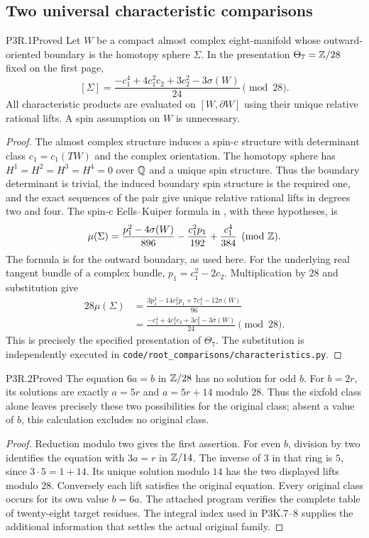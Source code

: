 \subsection{Two universal characteristic comparisons}

\begin{statement}{P3R.1}{Proved}
Let $W$ be a compact almost complex eight-manifold whose
outward-oriented boundary is the homotopy sphere $\Sigma$.
In the presentation $\Theta_7=\mathbb Z/28$ fixed on the first page,
\[
 [\Sigma]=
 \frac{-c_1^4+4c_1^2c_2+3c_2^2-3\sigma(W)}{24}
 \pmod {28}.
\]
All characteristic products are evaluated on $[W,\partial W]$
using their unique relative rational lifts. A spin assumption
on $W$ is unnecessary.
\end{statement}
\begin{proof}
The almost complex structure induces a spin-c structure
with determinant class $c_1=c_1(TW)$ and the complex
orientation. The homotopy sphere has $H^1=H^2=H^3=H^4=0$
over $\mathbb Q$ and a unique spin structure. Thus the boundary
determinant is trivial, the induced boundary spin structure
is the required one, and the exact sequences of the pair
give unique relative rational lifts in degrees two and four.
The spin-c Eells--Kuiper formula in \cite[Section~3.1(v)]{Jiang2014},
with these hypotheses, is
\[
 \mu(\Sigma)=
 \frac{p_1^2-4\sigma(W)}{896}
 -\frac{c_1^2p_1}{192}+\frac{c_1^4}{384}
 \pmod{\mathbb Z}.
\]
The formula is for the outward boundary, as used here.
For the underlying real tangent bundle of a complex bundle,
$p_1=c_1^2-2c_2$. Multiplication by $28$ and substitution
give
\[
 \begin{split}
 28\mu(\Sigma)
 &=\frac{3p_1^2-14c_1^2p_1+7c_1^4-12\sigma(W)}{96}\\
 &=\frac{-c_1^4+4c_1^2c_2+3c_2^2-3\sigma(W)}{24}
 \pmod {28}.
 \end{split}
\]
This is precisely the specified presentation of $\Theta_7$.
The substitution is independently executed in
\texttt{code/root\_comparisons/characteristics.py}.
\end{proof}

\begin{statement}{P3R.2}{Proved}
The equation $6a=b$ in $\mathbb Z/28$ has no solution for odd $b$.
For $b=2r$, its solutions are exactly
$a=5r$ and $a=5r+14$ modulo $28$.
Thus the sixfold class alone leaves precisely these two
possibilities for the original class; absent a value of $b$,
this calculation excludes no original class.
\end{statement}
\begin{proof}
Reduction modulo two gives the first assertion. For even
$b$, division by two identifies the equation with
$3a=r$ in $\mathbb Z/14$. The inverse of $3$ in that ring is
$5$, since $3\cdot5=1+14$. Its unique solution modulo
$14$ has the two displayed lifts modulo $28$.
Conversely each lift satisfies the original equation.
Every original class occurs for its own value $b=6a$.
The attached program verifies the complete table of
twenty-eight target residues. The integral index used
in P3K.7--8 supplies the additional information that
settles the actual original family.
\end{proof}

